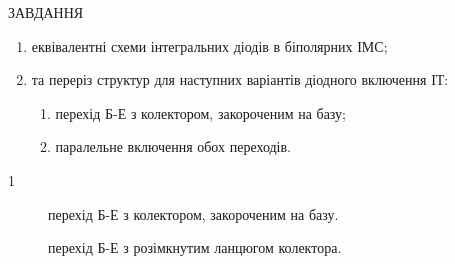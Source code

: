 \documentclass[a4paper,14pt]{extreport}
\begin{document}
\begin{center}ЗАВДАННЯ\end{center}

\begin{enumerate}
  \item еквівалентні схеми інтегральних діодів в біполярних ІМС;
  \item та переріз структур для наступних варіантів діодного включення ІТ:
  \begin{enumerate}
    \item перехід Б-Е з колектором, закороченим на базу;
    \item паралельне включення обох переходів.
  \end{enumerate}
\end{enumerate}

\begin{center}1\end{center}

\begin{figure}[h]
  \caption{перехід Б-Е з колектором, закороченим на базу.}
  \label{ris1}
\end{figure}

\begin{figure}[h]
  \caption{перехід Б-Е з розімкнутим ланцюгом колектора.}
  \label{ris1}
\end{figure}
\end{document}
